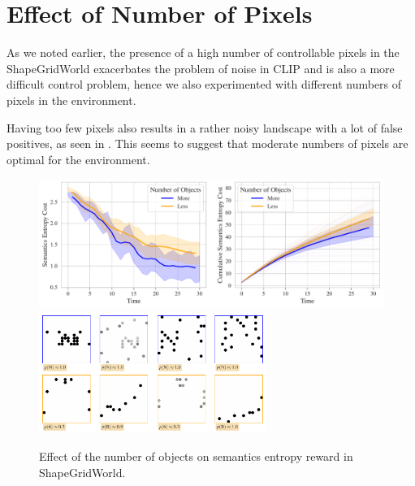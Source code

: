\section{Effect of Number of Pixels}
\label{sec:sgw-pixels}

As we noted earlier, the presence of a high number of controllable pixels in the ShapeGridWorld exacerbates the problem of noise in CLIP and is also a more difficult control problem, hence we also experimented with different numbers of pixels in the environment.

Having too few pixels also results in a rather noisy landscape with a lot of false positives, as seen in .
This seems to suggest that moderate numbers of pixels are optimal for the environment.

\begin{figure}[h]
    \centering
    \includegraphics[width=\textwidth]{images/n_objects_comparison_sgw.pdf}
    \vspace{12pt}
    \includegraphics[width=0.66\textwidth]{images/n_objects_samples_sgw.pdf}
    \caption{Effect of the number of objects on semantics entropy reward in ShapeGridWorld.}
    \label{fig:n-objects-sgw}
\end{figure}

